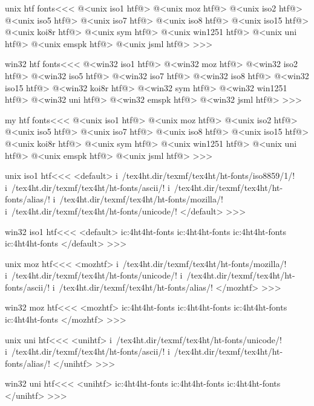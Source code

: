 \documentclass{article}
\begin{document}
\<unix htf fonts\><<<
@<unix iso1 htf@>
@<unix moz htf@>
@<unix iso2 htf@>
@<unix iso5 htf@>
@<unix iso7 htf@>
@<unix iso8 htf@>
@<unix iso15 htf@>
@<unix koi8r htf@>
@<unix sym htf@>
@<unix win1251 htf@>
@<unix uni htf@>
@<unix emspk htf@>
@<unix jsml htf@>
>>>





\<win32 htf fonts\><<<
@<win32 iso1 htf@>
@<win32 moz htf@>
@<win32 iso2 htf@>
@<win32 iso5 htf@>
@<win32 iso7 htf@>
@<win32 iso8 htf@>
@<win32 iso15 htf@>
@<win32 koi8r htf@>
@<win32 sym htf@>
@<win32 win1251 htf@>
@<win32 uni htf@>
@<win32 emspk htf@>
@<win32 jsml htf@>
>>>



\<my htf fonts\><<<
@<unix iso1 htf@>
@<unix moz htf@>
@<unix iso2 htf@>
@<unix iso5 htf@>
@<unix iso7 htf@>
@<unix iso8 htf@>
@<unix iso15 htf@>
@<unix koi8r htf@>
@<unix sym htf@>
@<unix win1251 htf@>
@<unix uni htf@>
@<unix emspk htf@>
@<unix jsml htf@>
>>>



\<unix iso1 htf\><<<
<default>
i~/tex4ht.dir/texmf/tex4ht/ht-fonts/iso8859/1/!
i~/tex4ht.dir/texmf/tex4ht/ht-fonts/ascii/!
i~/tex4ht.dir/texmf/tex4ht/ht-fonts/alias/!
i~/tex4ht.dir/texmf/tex4ht/ht-fonts/mozilla/!
i~/tex4ht.dir/texmf/tex4ht/ht-fonts/unicode/!
</default>             
>>>


\<win32 iso1 htf\><<<
<default>
ic:\tex4ht\texmf\tex4ht\ht-fonts\1\!
ic:\tex4ht\texmf\tex4ht\ht-fonts\ascii\!
ic:\tex4ht\texmf\tex4ht\ht-fonts\alias\!
ic:\tex4ht\texmf\tex4ht\ht-fonts\unicode\!
</default>
>>>


\<unix moz htf\><<<
<mozhtf>
i~/tex4ht.dir/texmf/tex4ht/ht-fonts/mozilla/!
i~/tex4ht.dir/texmf/tex4ht/ht-fonts/unicode/!
i~/tex4ht.dir/texmf/tex4ht/ht-fonts/ascii/!
i~/tex4ht.dir/texmf/tex4ht/ht-fonts/alias/!
</mozhtf>
>>>




\<win32 moz htf\><<<
<mozhtf>
ic:\tex4ht\texmf\tex4ht\ht-fonts\mozilla\!
ic:\tex4ht\texmf\tex4ht\ht-fonts\unicode\!
ic:\tex4ht\texmf\tex4ht\ht-fonts\ascii\!
ic:\tex4ht\texmf\tex4ht\ht-fonts\alias\!
</mozhtf>
>>>



\<unix uni htf\><<<
<unihtf>
i~/tex4ht.dir/texmf/tex4ht/ht-fonts/unicode/!
i~/tex4ht.dir/texmf/tex4ht/ht-fonts/ascii/!
i~/tex4ht.dir/texmf/tex4ht/ht-fonts/alias/!
</unihtf>
>>>



\<win32 uni htf\><<<
<unihtf>
ic:\tex4ht\texmf\tex4ht\ht-fonts\unicode\!
ic:\tex4ht\texmf\tex4ht\ht-fonts\ascii\!
ic:\tex4ht\texmf\tex4ht\ht-fonts\alias\!
</unihtf>
>>>
\end{document}
